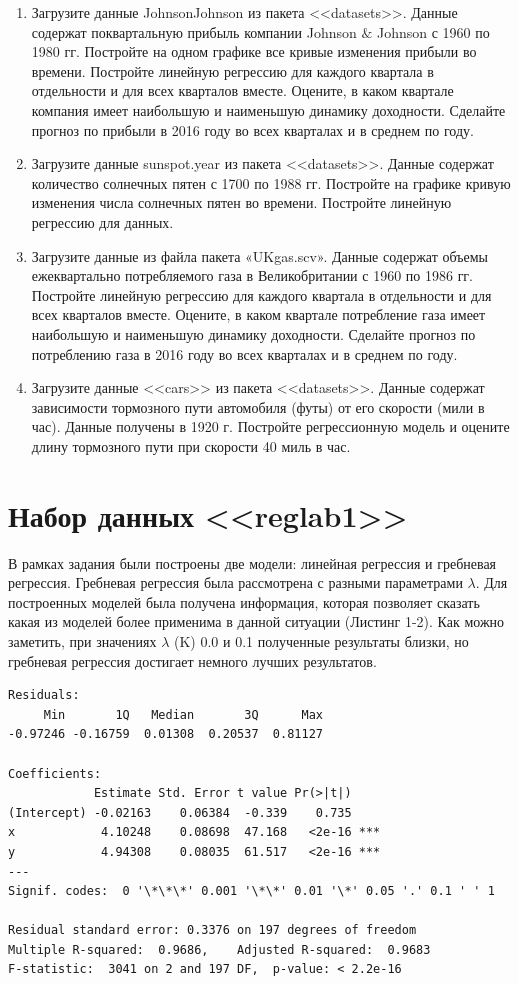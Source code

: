 \documentclass[]{article}
\numberwithin{equation}{section}
\begin{document}
\begin{enumerate}
        \item Загрузите данные JohnsonJohnson из пакета <<datasets>>. Данные содержат поквартальную прибыль компании Johnson $\&$ Johnson с 1960 по 1980 гг. Постройте на одном графике все кривые изменения прибыли во времени. Постройте линейную регрессию для каждого квартала в отдельности и для всех кварталов вместе. Оцените, в каком квартале компания имеет наибольшую и наименьшую динамику доходности. Сделайте прогноз по прибыли в 2016 году во всех кварталах и в среднем по году.
        \item Загрузите данные sunspot.year из пакета <<datasets>>. Данные содержат количество солнечных пятен с 1700 по 1988 гг. Постройте на графике кривую изменения числа солнечных пятен во времени. Постройте линейную регрессию для данных.
        \item Загрузите данные из файла пакета «UKgas.scv». Данные содержат объемы ежеквартально потребляемого газа в Великобритании с 1960 по 1986 гг. Постройте линейную регрессию для каждого квартала в отдельности и для всех кварталов вместе. Оцените, в каком квартале потребление газа имеет наибольшую и наименьшую динамику доходности. Сделайте прогноз по потреблению газа в 2016 году во всех кварталах и в среднем по году.
        \item Загрузите данные <<cars>> из пакета <<datasets>>. Данные содержат зависимости тормозного пути автомобиля (футы) от его скорости (мили в час). Данные получены в 1920 г. Постройте регрессионную модель и оцените длину тормозного пути при скорости 40 миль в час.
    \end{enumerate}

    \newpage
    \section{Набор данных <<reglab1>>}

    В рамках задания были построены две модели: линейная регрессия и гребневая регрессия. Гребневая регрессия была рассмотрена с разными параметрами $\lambda$. Для построенных моделей была получена информация, которая позволяет сказать какая из моделей более применима в данной ситуации (Листинг 1-2). Как можно заметить, при значениях $\lambda$ (K) 0.0 и 0.1 полученные результаты близки, но гребневая регрессия достигает немного лучших результатов.

    \begin{lstlisting}[style = TEXTstyle, caption = Сводка по алгоритму линейной регрессии]
Residuals:
     Min       1Q   Median       3Q      Max
-0.97246 -0.16759  0.01308  0.20537  0.81127

Coefficients:
            Estimate Std. Error t value Pr(>|t|)
(Intercept) -0.02163    0.06384  -0.339    0.735
x            4.10248    0.08698  47.168   <2e-16 ***
y            4.94308    0.08035  61.517   <2e-16 ***
---
Signif. codes:  0 '\*\*\*' 0.001 '\*\*' 0.01 '\*' 0.05 '.' 0.1 ' ' 1

Residual standard error: 0.3376 on 197 degrees of freedom
Multiple R-squared:  0.9686,    Adjusted R-squared:  0.9683
F-statistic:  3041 on 2 and 197 DF,  p-value: < 2.2e-16
    \end{lstlisting}
\end{document}
